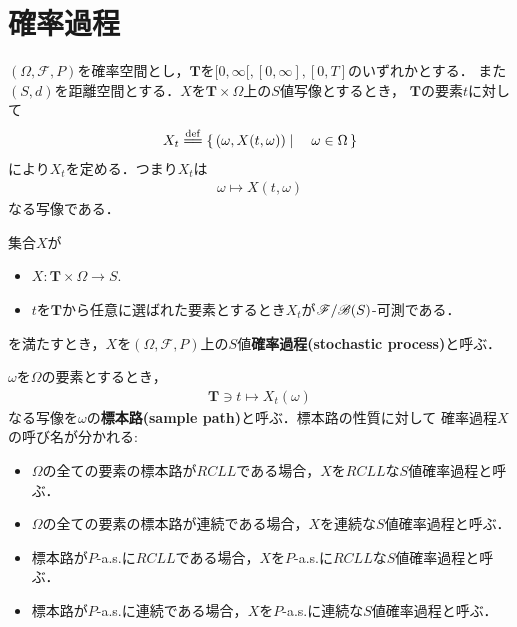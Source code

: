 \section{確率過程}
	$(\Omega,\mathscr{F},P)$を確率空間とし，$\mathbf{T}$を$[0,\infty[,[0,\infty],[0,T]$のいずれかとする．
	また$(S,d)$を距離空間とする．$X$を$\mathbf{T} \times \Omega$上の$S$値写像とするとき，
	$\mathbf{T}$の要素$t$に対して
	\begin{align}
		X_t \defeq \Set{(\omega,X(t,\omega))}{\omega \in \Omega}
	\end{align}
	により$X_t$を定める．つまり$X_t$は
	\begin{align}
		\omega \longmapsto X(t,\omega)
	\end{align}
	なる写像である．
	
	\begin{screen}
		\begin{dfn}[確率過程]
			集合$X$が
			\begin{itemize}
				\item $X:\mathbf{T} \times \Omega \longrightarrow S$.
				\item $t$を$\mathbf{T}$から任意に選ばれた要素とするとき$X_t$が$\mathscr{F}/\mathscr{B}(S)$-可測である．
			\end{itemize}
			を満たすとき，$X$を$(\Omega,\mathscr{F},P)$上の$S$値{\bf 確率過程}{\bf (stochastic process)}と呼ぶ．
		\end{dfn}
	\end{screen}
	
	$\omega$を$\Omega$の要素とするとき，
	\begin{align}
		\mathbf{T} \ni t \longmapsto X_t(\omega)
	\end{align}
	なる写像を$\omega$の{\bf 標本路}{\bf (sample path)}と呼ぶ．標本路の性質に対して
	確率過程$X$の呼び名が分かれる:
	\begin{itemize}
		\item $\Omega$の全ての要素の標本路が$RCLL$である場合，$X$を$RCLL$な$S$値確率過程と呼ぶ．
		\item $\Omega$の全ての要素の標本路が連続である場合，$X$を連続な$S$値確率過程と呼ぶ．
		\item 標本路が$P$-a.s.に\footnotemark$RCLL$である場合，$X$を$P$-a.s.に$RCLL$な$S$値確率過程と呼ぶ．
		\item 標本路が$P$-a.s.に連続である場合，$X$を$P$-a.s.に連続な$S$値確率過程と呼ぶ．
	\end{itemize}
	
	
